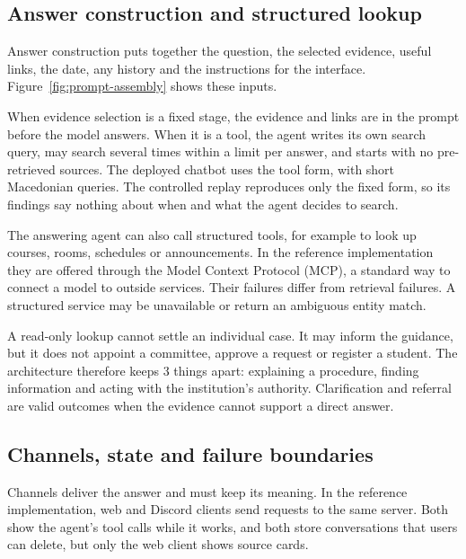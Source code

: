 \subsection{Answer construction and structured lookup}
\label{sec:arch-answer}

Answer construction puts together the question, the selected evidence, useful links, the date, any history and the instructions for the interface. Figure~\ref{fig:prompt-assembly} shows these inputs.



When evidence selection is a fixed stage, the evidence and links are in the prompt before the model answers. When it is a tool, the agent writes its own search query, may search several times within a limit per answer, and starts with no pre-retrieved sources. The deployed chatbot uses the tool form, with short Macedonian queries. The controlled replay reproduces only the fixed form, so its findings say nothing about when and what the agent decides to search.

The answering agent can also call structured tools, for example to look up courses, rooms, schedules or announcements. In the reference implementation they are offered through the Model Context Protocol (MCP), a standard way to connect a model to outside services. Their failures differ from retrieval failures. A structured service may be unavailable or return an ambiguous entity match.

A read-only lookup cannot settle an individual case. It may inform the guidance, but it does not appoint a committee, approve a request or register a student. The architecture therefore keeps 3 things apart: explaining a procedure, finding information and acting with the institution's authority. Clarification and referral are valid outcomes when the evidence cannot support a direct answer.

\subsection{Channels, state and failure boundaries}

Channels deliver the answer and must keep its meaning. In the reference implementation, web and Discord clients send requests to the same server. Both show the agent's tool calls while it works, and both store conversations that users can delete, but only the web client shows source cards.

